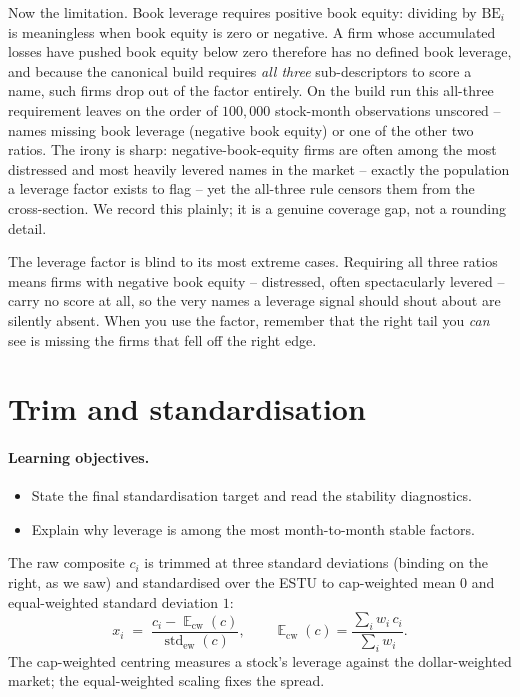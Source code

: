 \documentclass[11pt]{article}
\theoremstyle{definition}
\theoremstyle{plain}
\theoremstyle{remark}
\DeclareMathOperator{\std}{std}
\DeclareMathOperator*{\avg}{\mathbb{E}}
\begin{document}
Now the limitation. Book leverage requires positive book equity: dividing by $\text{BE}_i$ is meaningless when book equity is zero or negative. A firm whose accumulated losses have pushed book equity below zero therefore has no defined book leverage, and because the canonical build requires \emph{all three} sub-descriptors to score a name, such firms drop out of the factor entirely. On the build run this all-three requirement leaves on the order of $100{,}000$ stock-month observations unscored -- names missing book leverage (negative book equity) or one of the other two ratios. The irony is sharp: negative-book-equity firms are often among the most distressed and most heavily levered names in the market -- exactly the population a leverage factor exists to flag -- yet the all-three rule censors them from the cross-section. We record this plainly; it is a genuine coverage gap, not a rounding detail.

\begin{pitfall}
The leverage factor is blind to its most extreme cases. Requiring all three ratios means firms with negative book equity -- distressed, often spectacularly levered -- carry no score at all, so the very names a leverage signal should shout about are silently absent. When you use the factor, remember that the right tail you \emph{can} see is missing the firms that fell off the right edge.
\end{pitfall}

\section{Trim and standardisation}\label{sec:std}

\paragraph{Learning objectives.}
\begin{itemize}[leftmargin=1.4em,topsep=2pt]
  \item State the final standardisation target and read the stability diagnostics.
  \item Explain why leverage is among the most month-to-month stable factors.
\end{itemize}

The raw composite $c_i$ is trimmed at three standard deviations (binding on the right, as we saw) and standardised over the ESTU to cap-weighted mean $0$ and equal-weighted standard deviation $1$:
\[
x_i \;=\; \frac{c_i - \avg_{\text{cw}}(c)}{\std_{\text{ew}}(c)},
\qquad
\avg_{\text{cw}}(c) = \frac{\sum_i w_i\, c_i}{\sum_i w_i}.
\]
The cap-weighted centring measures a stock's leverage against the dollar-weighted market; the equal-weighted scaling fixes the spread.
\end{document}
